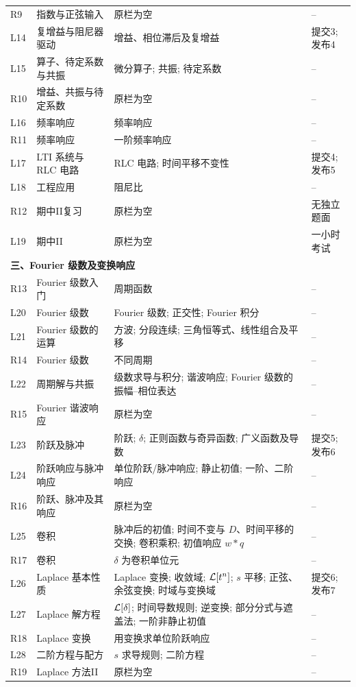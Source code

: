 \begin{longtable}{p{}p{}p{}p{}}
R9 & 指数与正弦输入 & 原栏为空 & -- \\
L14 & 复增益与阻尼器驱动 & 增益、相位滞后及复增益 & 提交3; 发布4 \\
L15 & 算子、待定系数与共振 & 微分算子; 共振; 待定系数 & -- \\
R10 & 增益、共振与待定系数 & 原栏为空 & -- \\
L16 & 频率响应 & 频率响应 & -- \\
R11 & 频率响应 & 一阶频率响应 & -- \\
L17 & LTI 系统与 RLC 电路 & RLC 电路; 时间平移不变性 & 提交4; 发布5 \\
L18 & 工程应用 & 阻尼比 & -- \\
R12 & 期中II复习 & 原栏为空 & 无独立题面 \\
L19 & 期中II & 原栏为空 & 一小时考试 \\
\multicolumn{4}{l}{\textbf{三、Fourier 级数及变换响应}}\\
R13 & Fourier 级数入门 & 周期函数 & -- \\
L20 & Fourier 级数 & Fourier 级数; 正交性; Fourier 积分 & -- \\
L21 & Fourier 级数的运算 & 方波; 分段连续; 三角恒等式、线性组合及平移 & -- \\
R14 & Fourier 级数 & 不同周期 & -- \\
L22 & 周期解与共振 & 级数求导与积分; 谐波响应; Fourier 级数的振幅--相位表达 & -- \\
R15 & Fourier 谐波响应 & 原栏为空 & -- \\
L23 & 阶跃及脉冲 & 阶跃; $\delta$; 正则函数与奇异函数; 广义函数及导数 & 提交5; 发布6 \\
L24 & 阶跃响应与脉冲响应 & 单位阶跃/脉冲响应; 静止初值; 一阶、二阶响应 & -- \\
R16 & 阶跃、脉冲及其响应 & 原栏为空 & -- \\
L25 & 卷积 & 脉冲后的初值; 时间不变与 $D$、时间平移的交换; 卷积乘积; 初值响应 $w*q$ & -- \\
R17 & 卷积 & $\delta$ 为卷积单位元 & -- \\
L26 & Laplace 基本性质 & Laplace 变换; 收敛域; $\mathcal L[t^n]$; $s$ 平移; 正弦、余弦变换; 时域与变换域 & 提交6; 发布7 \\
L27 & Laplace 解方程 & $\mathcal L[\delta]$; 时间导数规则; 逆变换; 部分分式与遮盖法; 一阶非静止初值 & -- \\
R18 & Laplace 变换 & 用变换求单位阶跃响应 & -- \\
L28 & 二阶方程与配方 & $s$ 求导规则; 二阶方程 & -- \\
R19 & Laplace 方法II & 原栏为空 & -- \\

\end{longtable}
